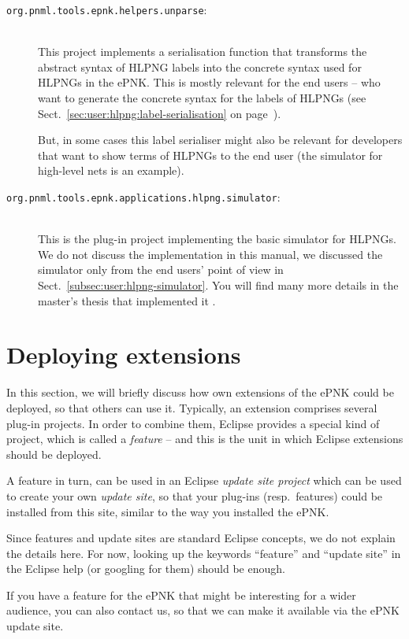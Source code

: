 \begin{description}
\item[{\tt org.pnml.tools.epnk.helpers.unparse}:] ~\\
   This project implements
   a serialisation function that transforms the abstract syntax of
   HLPNG labels into the concrete syntax used for HLPNGs in the ePNK.
   This is mostly relevant for the end users -- who want to generate
   the concrete syntax for the labels of HLPNGs (see
   Sect.~\ref{sec:user:hlpng:label-serialisation} on
   page~\pageref{sec:user:hlpng:label-serialisation}).
   
   But, in some cases this label serialiser might also be relevant
   for developers that want to show terms of HLPNGs to the end user
   (the simulator for high-level nets is an example). 
   
\item[{\tt org.pnml.tools.epnk.applications.hlpng.simulator}:] ~\\
   This is the
   plug-in project implementing the basic simulator for HLPNGs. We do not
   discuss the implementation in this manual, we discussed the simulator only
   from the end users' point of view in Sect.~\ref{subsec:user:hlpng-simulator}.
   You will find many more details in the master's thesis that implemented it
   \cite{Lag12}.
\end{description}

\section{Deploying extensions}
\label{sec:developer:deploy}  

In this section, we will briefly discuss how own extensions of the ePNK could
be deployed, so that others can use it. Typically, an extension comprises
several plug-in projects. In order to combine them, Eclipse provides a special
kind of project, which is called a \emph{feature}%
-- and this is the unit in which Eclipse extensions should be deployed. 


A feature in turn, can be used in an Eclipse \emph{update site project}%
which can be used to create your own \emph{update site}, so that your plug-ins
(resp.\ features) could be installed from this site, similar to the way you
installed the ePNK.

Since features and update sites are standard Eclipse concepts, we
do not explain the details here. For now, looking up the keywords ``feature''
and ``update site'' in the Eclipse help (or googling for them) should be
enough.

If you have a feature for the ePNK that might be interesting for a wider
audience, you can also contact us, so that we can make it available via the
ePNK update site.
